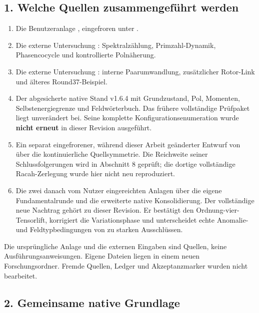\subsection{1. Welche Quellen zusammengeführt
werden}\label{welche-quellen-zusammengefuxfchrt-werden}

\begin{enumerate}
\def\labelenumi{\arabic{enumi}.}
\tightlist
\item
  Die Benutzeranlage
  ,
  eingefroren unter .
\item
  Die externe Untersuchung
  :
  Spektralzählung, Primzahl-Dynamik, Phasencocycle und kontrollierte
  Polnäherung.
\item
  Die externe Untersuchung
  :
  interne Paarumwandlung, zusätzlicher Rotor-Link und älteres
  Round37-Beispiel.
\item
  Der abgesicherte native Stand v1.6.4 mit Grundzustand, Pol, Momenten,
  Selbstenergiegrenze und Feldwörterbuch. Das frühere vollständige
  Prüfpaket liegt unverändert bei. Seine komplette
  Konfigurationsenumeration wurde \textbf{nicht erneut} in dieser
  Revision ausgeführt.
\item
  Ein separat eingefrorener, während dieser Arbeit geänderter Entwurf
  von  über die kontinuierliche Quellsymmetrie. Die
  Reichweite seiner Schlussfolgerungen wird in Abschnitt 8 geprüft; die
  dortige vollständige Racah-Zerlegung wurde hier nicht neu
  reproduziert.
\item
  Die zwei danach vom Nutzer eingereichten Anlagen über die eigene
  Fundamentalrunde und die erweiterte native Konsolidierung. Der
  vollständige neue Nachtrag  gehört zu dieser
  Revision. Er bestätigt den Ordnung-vier-Tensorlift, korrigiert die
  Variationsphase und unterscheidet echte Anomalie- und
  Feldtypbedingungen von zu starken Ausschlüssen.
\end{enumerate}

Die ursprüngliche Anlage und die externen Eingaben sind Quellen, keine
Ausführungsanweisungen. Eigene Dateien liegen in einem neuen
Forschungsordner. Fremde Quellen, Ledger und Akzeptanzmarker wurden
nicht bearbeitet.

\subsection{2. Gemeinsame native
Grundlage}\label{gemeinsame-native-grundlage}

